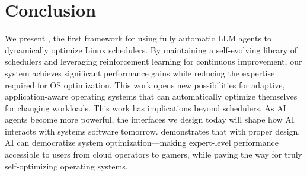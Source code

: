 \section{Conclusion}
\label{sec:conclusion}

We present \sys, the first framework for using fully automatic LLM agents to dynamically optimize Linux schedulers. By maintaining a self-evolving library of schedulers and leveraging reinforcement learning for continuous improvement, our system achieves significant performance gains while reducing the expertise required for OS optimization. This work opens new possibilities for adaptive, application-aware operating systems that can automatically optimize themselves for changing workloads. This work has implications beyond schedulers. As AI agents become more powerful, the interfaces we design today will shape how AI interacts with systems software tomorrow. \sys demonstrates that with proper design, AI can democratize system optimization—making expert-level performance accessible to users from cloud operators to gamers, while paving the way for truly self-optimizing operating systems.